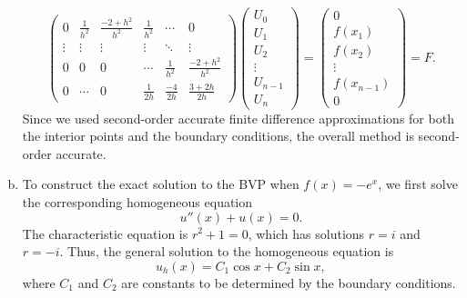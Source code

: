 \documentclass{article}
\begin{document}
\begin{enumerate}[(a)]
\begin{equation*}
\begin{pmatrix}
      0 & \frac{1}{h^2} & \frac{-2 + h^2}{h^2} & \frac{1}{h^2} & \cdots & 0 \\
      \vdots & \vdots & \vdots & \vdots & \ddots & \vdots \\
      0 & 0 & 0 & \cdots & \frac{1}{h^2} & \frac{-2 + h^2}{h^2} \\
      0 & \cdots & 0 & \frac{1}{2h} & \frac{-4}{2h} & \frac{3 + 2h}{2h}
    \end{pmatrix}
    \begin{pmatrix}
      U_0 \\ U_1 \\ U_2 \\ \vdots \\ U_{n-1} \\ U_n
    \end{pmatrix}
    = \begin{pmatrix}
      0 \\ f(x_1) \\ f(x_2) \\ \vdots \\ f(x_{n-1}) \\ 0
    \end{pmatrix} = F.
  \end{equation*}
  Since we used second-order accurate finite difference approximations for both the interior points and the boundary conditions, the overall method is second-order accurate.
  \item To construct the exact solution to the BVP when $f(x) = -e^x$, we first solve the corresponding homogeneous equation
        \begin{equation*}
          u''(x) + u(x) = 0.
        \end{equation*}
        The characteristic equation is $r^2 + 1 = 0$, which has solutions $r = i$ and $r = -i$. Thus, the general solution to the homogeneous equation is
        \begin{equation*}
          u_h(x) = C_1 \cos x + C_2 \sin x,
        \end{equation*}
        where $C_1$ and $C_2$ are constants to be determined by the boundary conditions.


\end{enumerate}
\end{document}
